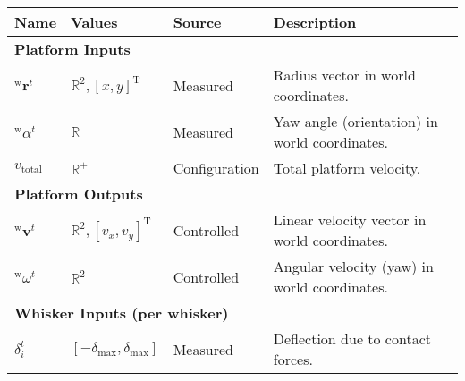 \begin{table}[htb]
    \centering
    \begin{tabular}{p{1cm} p{2cm} p{3cm} p{8cm}}
        \toprule
        \textbf{Name}                         & \textbf{Values}                                    & \textbf{Source}                                         & \textbf{Description}                                                                                                        \\
        \midrule
        \multicolumn{4}{l}{\textbf{Platform Inputs}} \\
        \midrule
        \(^{\mathrm{w}}\boldsymbol{r}^{t}\)   & \(\mathbb{R}^2, [x, y]^\textrm{T}\)                & Measured                                                & Radius vector in world coordinates.                                                                                         \\
        \(^{\mathrm{w}}\alpha^{t}\)           & \(\mathbb{R}\)                                     & Measured                                                & Yaw angle (orientation) in world coordinates.                                                                               \\
        \(v_{\textrm{total}}\)                & \(\mathbb{R}^{+}\)                                 & Configuration                                           & Total platform velocity.                                                                                                    \\
        \midrule
        \multicolumn{4}{l}{\textbf{Platform Outputs}} \\
        \midrule
        \(^{\mathrm{w}}\boldsymbol{v}^{t}\)   & \(\mathbb{R}^2, [v_x, v_y]^\textrm{T}\)            & Controlled                                              & Linear velocity vector in world coordinates.                                                                                \\
        \(^{\mathrm{w}}\omega^{t}\)           & \(\mathbb{R}^2\)                                   & Controlled                                              & Angular velocity (yaw) in world coordinates.                                                                                \\
        \midrule
        \multicolumn{4}{l}{\textbf{Whisker Inputs (per whisker)}} \\
        \midrule
        \(\delta_{i}^{t}\)                    & \([-\delta_{\textrm{max}},\delta_{\textrm{max}}]\) & Measured                                                & Deflection due to contact forces.                                                                                           \\

\end{tabular}
\end{table}
